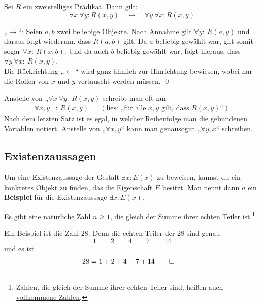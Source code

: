   \begin{sat}
  Sei $R$ ein zweistelliges Prädikat. Dann gilt:
  \[\forall x\ \forall y: R(x,y) \quad \leftrightarrow\quad \forall y\ \forall x: R(x,y) \]
 \end{sat}
 \begin{bew}
  „$\to$“: Seien $a,b$ zwei beliebige Objekte. Nach Annahme gilt $\forall y:\ R(a,y)$ und daraus folgt wiederum, dass $R(a,b)$ gilt. Da $a$ beliebig gewählt war, gilt somit sogar $\forall x:\ R(x,b)$. Und da auch $b$ beliebig gewählt war, folgt hieraus, dass $\forall y\ \forall x:\ R(x,y)$. \\
  Die Rückrichtung „$\leftarrow$“ wird ganz ähnlich zur Hinrichtung bewiesen, wobei nur die Rollen von $x$ und $y$ vertauscht werden müssen. \qed
 \end{bew}

 
 
 \begin{bem}
  Anstelle von „$\forall x\ \forall y:\ R(x,y)$ schreibt man oft nur
  \begin{align*}
   \forall x,y&:\ R(x,y) && (\text{lies: „für alle $x,y$ gilt, dass $R(x,y)$“}) 
  \end{align*}
  Nach dem letzten Satz ist es egal, in welcher Reihenfolge man die gebundenen Variablen notiert. Anstelle von „$\forall x,y$“ kann man genausogut „$\forall y,x$“ schreiben.
 \end{bem}

 
 
 \subsection{Existenzaussagen}
  
 
 \begin{axi} \label{exaxiom}
  Um eine Existenzaussage der Gestalt $\exists x: E(x)$ zu beweisen, kannst du ein konkretes Objekt zu finden, das die Eigenschaft $E$ besitzt. Man nennt dann $a$ ein \textbf{Beispiel} für die Existenzaussage $\exists x: E(x)$.
 \end{axi}


 
  \begin{bsp}
   Es gibt eine natürliche Zahl $n\geq 1$, die gleich der Summe ihrer echten Teiler ist.\footnote{   Zahlen, die gleich der Summe ihrer echten Teiler sind, heißen auch \href{https://de.wikipedia.org/wiki/Vollkommene_Zahl}{vollkommene Zahlen}.}
   \end{bsp}
   \begin{bew}
   Ein Beispiel ist die Zahl $28$. Denn die echten Teiler der $28$ sind genau
   \[ 1 \qquad 2 \qquad 4 \qquad 7 \qquad 14 \]
   und es ist
   \begin{align*}
    28 & = 1+2+4+7+14 \qed
   \end{align*}
  \end{bew}
  
